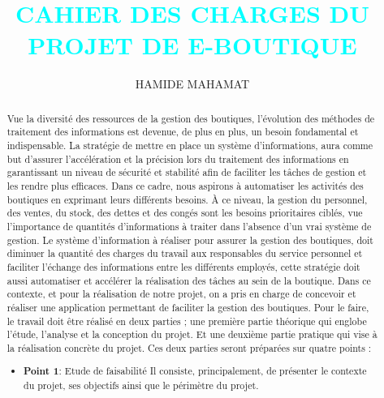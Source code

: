 \documentclass[a4paper,11pt]{article}
\title {\textcolor{cyan}{\textbf{CAHIER DES CHARGES DU PROJET DE E-BOUTIQUE}}}
\author{HAMIDE MAHAMAT}
\begin{document}
\maketitle
\thispagestyle{empty}

\newpage
{}
\tableofcontents
\newpage
\listoffigures
\newpage
\begin{abstract}
Vue la diversité des ressources de la gestion des boutiques, l’évolution des méthodes de traitement des informations est devenue, de plus en plus, un besoin fondamental et indispensable.
\newline La stratégie de mettre en place un système d’informations, aura comme but d’assurer l’accélération et la précision lors du traitement des informations en garantissant un niveau de
sécurité et stabilité afin de faciliter les tâches de gestion et les rendre plus efficaces.
\newline Dans ce cadre, nous aspirons à automatiser les activités des boutiques en exprimant leurs différents besoins. À ce niveau, la gestion du personnel, des ventes, du stock, des dettes et des congés sont les besoins prioritaires ciblés, vue l’importance de quantités d’informations à traiter dans l’absence d’un vrai système de gestion.
\newline Le système d’information à réaliser pour assurer la gestion des boutiques, doit diminuer la quantité des charges du travail aux responsables du service personnel et faciliter l’échange des
informations entre les différents employés, cette stratégie doit aussi automatiser et accélérer la réalisation des tâches au sein de la boutique.
\newline Dans ce contexte, et pour la réalisation de notre projet, on a pris en charge de concevoir et réaliser une application permettant de faciliter la gestion des boutiques.
\newline
\newline Pour le faire, le travail doit être réalisé en deux parties ; une première partie théorique qui englobe l’étude, l’analyse et la conception du projet. Et une deuxième partie pratique qui vise à la réalisation concrète du projet. Ces deux parties seront préparées sur quatre points :
\begin{itemize}
  \item \textbf{Point 1}: Etude de faisabilité 
  \newline Il consiste, principalement, de présenter le contexte du projet, ses objectifs ainsi que le périmètre du projet.
  

\end{itemize}
\end{abstract}
\end{document}
